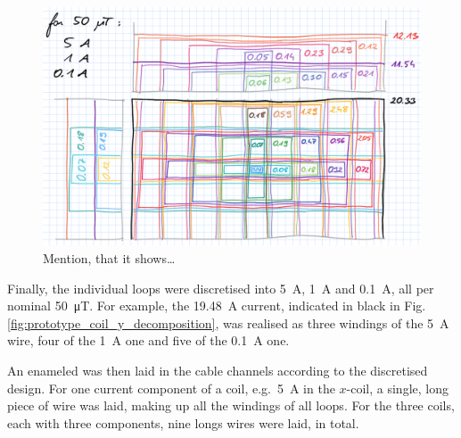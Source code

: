 


\begin{figure}
  \centering
  \includegraphics[width=0.9\linewidth]{gfx/prototype/coil_x_z_decomposition.png}
  \caption{Mention, that it shows\ldots}
  \label{fig:prototype_coil_x_z_decomposition}
\end{figure}

Finally, the individual loops were discretised into \SI{5}{\ampere}, \SI{1}{\ampere} and \SI{0.1}{\ampere}, all per nominal \SI{50}{\micro\tesla}. For example, the \SI{19.48}{\ampere} current, indicated in black in Fig.\,\ref{fig:prototype_coil_y_decomposition}, was realised as three windings of the \SI{5}{\ampere} wire, four of the \SI{1}{\ampere} one and five of the \SI{0.1}{\ampere} one.

An enameled was then laid in the cable channels according to the discretised design. For one current component of a coil, e.g.\ \SI{5}{\ampere} in the $x$-coil, a single, long piece of wire was laid, making up all the windings of all loops. For the three coils, each with three components, nine longs wires were laid, in total.

